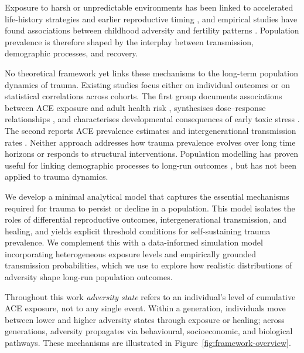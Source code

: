 \documentclass{article}
\begin{document}
Exposure to harsh or unpredictable environments has been linked to accelerated
life-history strategies and earlier reproductive timing \cite{ellis2009fundamental},
and empirical studies have found associations between childhood adversity and
fertility patterns \cite{williams2019adverse}. Population prevalence is therefore
shaped by the interplay between transmission, demographic processes, and recovery.

No theoretical framework yet links these mechanisms to the long-term population
dynamics of trauma. Existing studies focus either on individual outcomes or on
statistical correlations across cohorts. The first group documents associations
between ACE exposure and adult health risk \cite{felitti1998relationship},
synthesises dose--response relationships \cite{hughes2017effect}, and
characterises developmental consequences of early toxic stress
\cite{shonkoff2012lifelong}. The second reports ACE prevalence estimates
\cite{joshi2021prevalence} and intergenerational transmission rates
\cite{madigan2019intergenerational}.
Neither approach addresses how trauma prevalence evolves over long time horizons
or responds to structural interventions. Population modelling has proven useful
for linking demographic processes to long-run outcomes \cite{caswell2001matrix},
but has not been applied to trauma dynamics.

We develop a minimal analytical model that captures the essential mechanisms
required for trauma to persist or decline in a population. This model isolates
the roles of differential reproductive outcomes, intergenerational transmission,
and healing, and yields explicit threshold conditions for self-sustaining trauma
prevalence. We complement this with a data-informed simulation model
incorporating heterogeneous exposure levels and empirically grounded
transmission probabilities, which we use to explore how realistic distributions
of adversity shape long-run population outcomes.

Throughout this work \emph{adversity state} refers to an individual's level of
cumulative ACE exposure, not to any single event. Within a generation,
individuals move between lower and higher adversity states through exposure or
healing; across generations, adversity propagates via behavioural, socioeconomic,
and biological pathways. These mechanisms are illustrated in
Figure~\ref{fig:framework-overview}.
\end{document}
